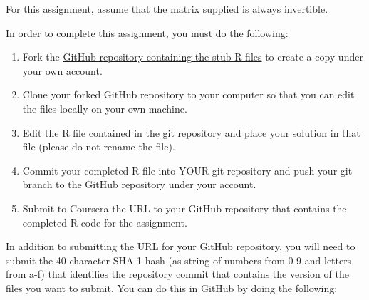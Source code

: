 \documentclass[
]{article}
\newenvironment{Shaded}{\begin{snugshade}}{\end{snugshade}}
\newcommand{\CommentTok}[1]{\textcolor[rgb]{0.56,0.35,0.01}{\textit{#1}}}
\newcommand{\ControlFlowTok}[1]{\textcolor[rgb]{0.13,0.29,0.53}{\textbf{#1}}}
\newcommand{\KeywordTok}[1]{\textcolor[rgb]{0.13,0.29,0.53}{\textbf{#1}}}
\newcommand{\NormalTok}[1]{#1}
\newcommand{\OperatorTok}[1]{\textcolor[rgb]{0.81,0.36,0.00}{\textbf{#1}}}
\newcommand{\StringTok}[1]{\textcolor[rgb]{0.31,0.60,0.02}{#1}}
\providecommand{\tightlist}{%
  \setlength{\itemsep}{0pt}\setlength{\parskip}{0pt}}
\begin{document}
\begin{Shaded}
\end{Shaded}

For this assignment, assume that the matrix supplied is always
invertible.

In order to complete this assignment, you must do the following:

\begin{enumerate}
\def\labelenumi{\arabic{enumi}.}
\tightlist
\item
  Fork the
  \href{https://github.com/rdpeng/ProgrammingAssignment2}{GitHub
  repository containing the stub R files} to create a copy under your
  own account.
\item
  Clone your forked GitHub repository to your computer so that you can
  edit the files locally on your own machine.
\item
  Edit the R file contained in the git repository and place your
  solution in that file (please do not rename the file).
\item
  Commit your completed R file into YOUR git repository and push your
  git branch to the GitHub repository under your account.
\item
  Submit to Coursera the URL to your GitHub repository that contains the
  completed R code for the assignment.
\end{enumerate}

In addition to submitting the URL for your GitHub repository, you will
need to submit the 40 character SHA-1 hash (as string of numbers from
0-9 and letters from a-f) that identifies the repository commit that
contains the version of the files you want to submit. You can do this in
GitHub by doing the following:
\end{document}

